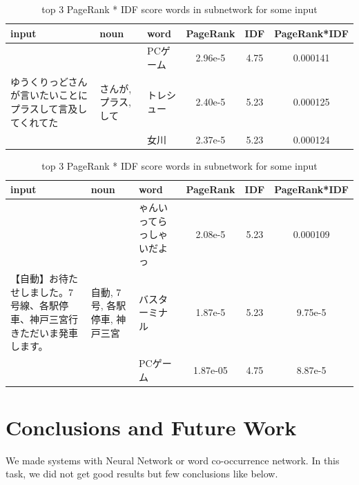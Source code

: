\documentclass{../style/sig-alternate}
\begin{document}
\begin{table}
    \begin{center}
    \caption{top 3 PageRank * IDF score words in subnetwork for some input}
    \label{tab:subnetwork1}
    \begin{tabular}{|p{20em}|p{5em}|p{5em}|c|c|c|} \hline
    input & noun & word & PageRank & IDF & PageRank*IDF\\ \hline
    & & PCゲーム & 2.96e-5 & 4.75 & 0.000141\\ \cline{3-6}
    ゆうくりっどさんが言いたいことにプラスして言及してくれてた & さんが, プラス, して & トレシュー & 2.40e-5 & 5.23 & 0.000125\\ \cline{3-6}
    & & 女川 & 2.37e-5 & 5.23 & 0.000124\\ \hline
    \end{tabular}
    \end{center}
\end{table}


\begin{table}
    \begin{center}
    \caption{top 3 PageRank * IDF score words in subnetwork for some input}
    \label{tab:subnetwork2}
    \begin{tabular}{|p{20em}|p{5em}|p{5em}|c|c|c|} \hline
    input & noun & word & PageRank & IDF & PageRank*IDF\\ \hline
    & & ゃんいってらっしゃいだよっ & 2.08e-5 & 5.23 & 0.000109\\ \cline{3-6}
    【自動】\newline お待たせしました。\newline 7号線、各駅停車、神戸三宮行き\newline ただいま発車します。 & 自動, 7号, 各駅停車, 神戸三宮 & バスターミナル & 1.87e-5 & 5.23 & 9.75e-5\\ \cline{3-6}
    & & PCゲーム & 1.87e-05 & 4.75 & 8.87e-5\\ \hline
    \end{tabular}
    \end{center}
\end{table}

\section{Conclusions and Future Work}
\label{sec:conclusions}
We made systems with Neural Network or word co-occurrence network. In this task, we did not get good results but few conclusions like below.
\end{document}
